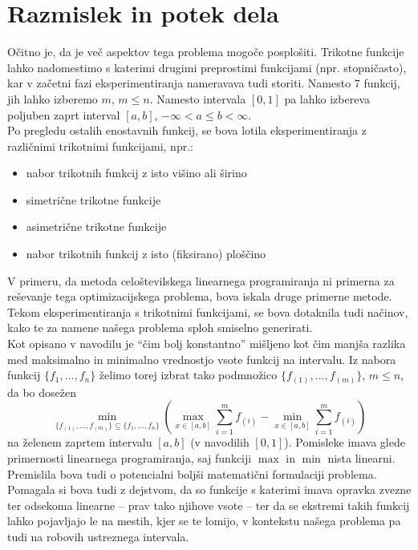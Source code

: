 \documentclass[11pt]{article}
\theoremstyle{definition}
\newcommand{\1}{\mathbbm{1}}
\newcommand{\set}[1]{\{#1\}}
\begin{document}
\section{Razmislek in potek dela}
\vspace{0.5cm}

Očitno je, da je več aspektov tega problema mogoče posplošiti. Trikotne funkcije lahko nadomestimo s katerimi drugimi preprostimi funkcijami (npr. stopničasto), kar v začetni fazi eksperimentiranja nameravava tudi storiti. Namesto 7 funkcij, jih lahko izberemo $m$, $m \leq n$. Namesto intervala $[0,1]$ pa lahko izbereva poljuben zaprt interval $[a,b]$, $-\infty < a \leq b < \infty$. \\

\noindent Po pregledu ostalih enostavnih funkcij, se bova lotila eksperimentiranja z različnimi trikotnimi funkcijami, npr.:
\begin{itemize}
	\item nabor trikotnih funkcij z isto višino ali širino
	\item simetrične trikotne funkcije
	\item asimetrične trikotne funkcije
	\item nabor trikotnih funkcij z isto (fiksirano) ploščino
\end{itemize}
\vspace{0.5cm}

\noindent V primeru, da metoda celoštevilskega linearnega programiranja ni primerna za reševanje tega optimizacijskega problema, bova iskala druge primerne metode. Tekom eksperimentiranja s trikotnimi funkcijami, se bova dotaknila tudi načinov, kako te za namene našega problema sploh smiselno generirati. \\

\noindent Kot opisano v navodilu je ``čim bolj konstantno'' mišljeno kot čim manjša razlika med maksimalno in minimalno vrednostjo vsote funkcij na intervalu. Iz nabora funkcij $\set{f_1,\ldots,f_n}$ želimo torej izbrat tako podmnožico $\set{f_{(1)},\ldots,f_{(m)}}$, $m \leq n$, da bo dosežen
$$\min_{\set{f_{(1)},\ldots,f_{(m)}} \subseteq \set{f_1,\ldots,f_n}}\left({\max_{x \in [a,b]}\sum_{i=1}^m f_{(i)} - \min_{x \in [a,b]}\sum_{i=1}^m f_{(i)}}\right)$$
na želenem zaprtem intervalu $[a,b]$ (v navodilih $[0,1]$). Pomisleke imava glede primernosti linearnega programiranja, saj funkciji $\max$ in $\min$ nista linearni. Premislila bova tudi o potencialni boljši matematični formulaciji problema. Pomagala si bova tudi z dejstvom, da so funkcije s katerimi imava opravka zvezne ter odsekoma linearne -- prav tako njihove vsote -- ter da se ekstremi takih funkcij lahko pojavljajo le na mestih, kjer se te lomijo, v kontekstu našega problema pa tudi na robovih ustreznega intervala.
\end{document}
